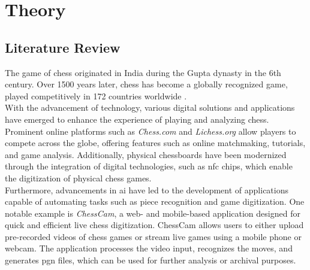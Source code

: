 \chapter{Theory}

\section{Literature Review}

The game of chess originated in India during the Gupta dynasty in the 6th century. Over 1500 years later, chess has become a globally recognized game, played competitively in 172 countries worldwide \cite{artsnculture}. \\

With the advancement of technology, various digital solutions and applications have emerged to enhance the experience of playing and analyzing chess. Prominent online platforms such as \textit{Chess.com} and \textit{Lichess.org} allow players to compete across the globe, offering features such as online matchmaking, tutorials, and game analysis. Additionally, physical chessboards have been modernized through the integration of digital technologies, such as \gls{nfc} chips, which enable the digitization of physical chess games. \\

Furthermore, advancements in \gls{ai} have led to the development of applications capable of automating tasks such as piece recognition and game digitization. One notable example is \textit{ChessCam}, a web- and mobile-based application designed for quick and efficient live chess digitization. ChessCam allows users to either upload pre-recorded videos of chess games or stream live games using a mobile phone or webcam. The application processes the video input, recognizes the moves, and generates \gls{pgn} files, which can be used for further analysis or archival purposes.



